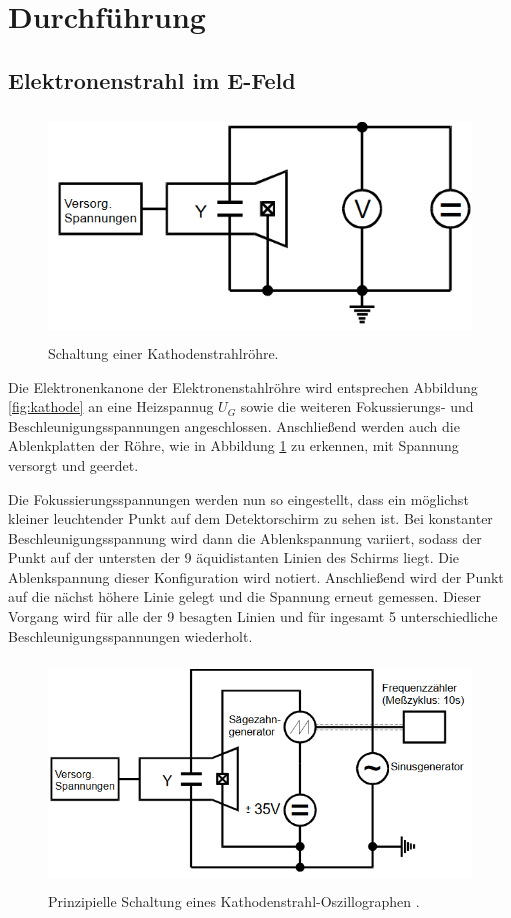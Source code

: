\section{Durchführung}
\label{sec:Durchführung}

\subsection{Elektronenstrahl im E-Feld}
\begin{figure}[H]
  \centering
  \includegraphics[height=6cm]{Elektronenstrahlroehre_Schaltung.PNG}
  \caption{Schaltung einer Kathodenstrahlröhre. \cite{sample}}
  \label{fig:Schaltung}
\end{figure}

Die Elektronenkanone der Elektronenstahlröhre wird entsprechen Abbildung \ref{fig:kathode}
an eine Heizspannug $U_G$ sowie die weiteren Fokussierungs- und Beschleunigungsspannungen angeschlossen.
Anschließend werden auch die Ablenkplatten der Röhre, wie in Abbildung \ref{fig:Schaltung} zu erkennen, mit Spannung
versorgt und geerdet.

Die Fokussierungsspannungen werden nun so eingestellt, dass ein möglichst kleiner leuchtender Punkt auf dem
Detektorschirm zu sehen ist. Bei konstanter Beschleunigungsspannung wird dann die Ablenkspannung variiert, sodass
der Punkt auf der untersten der 9 äquidistanten Linien des Schirms liegt. Die Ablenkspannung dieser Konfiguration wird
notiert. Anschließend wird der Punkt auf die nächst höhere Linie gelegt und die Spannung erneut gemessen.
Dieser Vorgang wird für alle der 9 besagten Linien und für ingesamt 5 unterschiedliche Beschleunigungsspannungen wiederholt.

\begin{figure}[H]
  \centering
  \includegraphics[height=6cm]{Oszilloskop_Schaltung.PNG}
  \caption{Prinzipielle Schaltung eines Kathodenstrahl-Oszillographen . \cite{sample}}
  \label{fig:Schaltung1}
\end{figure}

